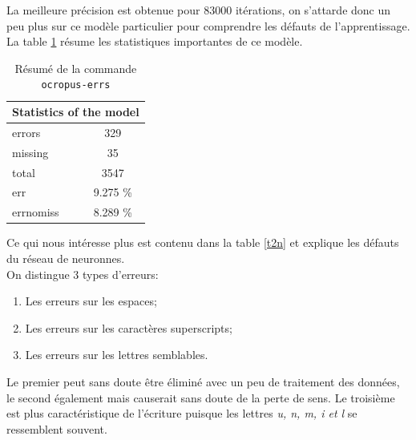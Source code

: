 \documentclass{article}
\begin{document}
La meilleure précision est obtenue pour 83000 itérations, on s'attarde donc un peu plus sur ce modèle particulier pour comprendre les défauts de l'apprentissage. La table \ref{t1n} résume les statistiques importantes de ce modèle. \\

\begin{table}[!h]
\centering
\begin{tabular}{|l|l|lc|l|l|}
\hline
\multicolumn{6}{|c|}{\cellcolor[gray]{0.8}Statistics of the model}                   \\ \hline
\multicolumn{3}{|l|}{errors}    & \multicolumn{3}{c|}{329}      \\ \hline
\multicolumn{3}{|l|}{missing}   & \multicolumn{3}{c|}{35}       \\ \hline
\multicolumn{3}{|l|}{total}     & \multicolumn{3}{c|}{3547}     \\ \hline
\multicolumn{3}{|l|}{err}       & \multicolumn{3}{c|}{9.275 \%} \\ \hline
\multicolumn{3}{|l|}{errnomiss} & \multicolumn{3}{c|}{8.289 \%} \\ \hline
\end{tabular}
\caption{Résumé de la commande \texttt{ocropus-errs}}
\label{t1n}
\end{table}

Ce qui nous intéresse plus est contenu dans la table \ref{t2n} et explique les défauts du réseau de neuronnes. \\
On distingue 3 types d'erreurs:
\begin{enumerate}[parsep=0.1cm,itemsep=0.1cm,topsep=0.1cm]
    \item Les erreurs sur les espaces;
    \item Les erreurs sur les caractères superscripts;
    \item Les erreurs sur les lettres semblables. 
\end{enumerate}

\noindent Le premier peut sans doute être éliminé avec un peu de traitement des données, le second également mais causerait sans doute de la perte de sens. Le troisième est plus caractéristique de l'écriture puisque les lettres \textit{u, n, m, i et l} se ressemblent souvent.
\end{document}

